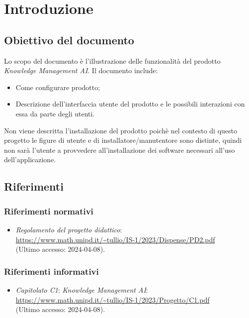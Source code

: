 \documentclass[10pt, a4paper]{article}
\title{\titolo}
\author{SWEetCode}
\begin{document}



\newpage

\tableofcontents
\newpage

\listoffigures
\newpage
\section{Introduzione}
\subsection{Obiettivo del documento}
Lo scopo del documento è l'illustrazione delle funzionalità del prodotto \textit{Knowledge Management AI}. Il documento include: 
\begin{itemize}
    \item Come configurare prodotto;
    \item Descrizione dell'interfaccia utente del prodotto e le possibili interazioni con essa da parte degli utenti.
\end{itemize} 
Non viene descritta l'installazione del prodotto poichè nel contesto di questo progetto le figure di utente e di installatore/manutentore sono distinte, quindi non sarà l'utente a provvedere all'installazione dei software necessari all'uso dell'applicazione.


\subsection{Riferimenti}
\subsubsection{Riferimenti normativi}
\begin{itemize}
    \item \textit{Regolamento del progetto didattico}: \\
        \url{https://www.math.unipd.it/~tullio/IS-1/2023/Dispense/PD2.pdf}\\
        (Ultimo accesso: 2024-04-08).
    \end{itemize}
\subsubsection{Riferimenti informativi}
\begin{itemize}
        \item \textit{Capitolato C1}: \textit{Knowledge Management AI}: \\ \url{https://www.math.unipd.it/~tullio/IS-1/2023/Progetto/C1.pdf}\\
        (Ultimo accesso: 2024-04-08).
        \end{itemize}
\end{document}
